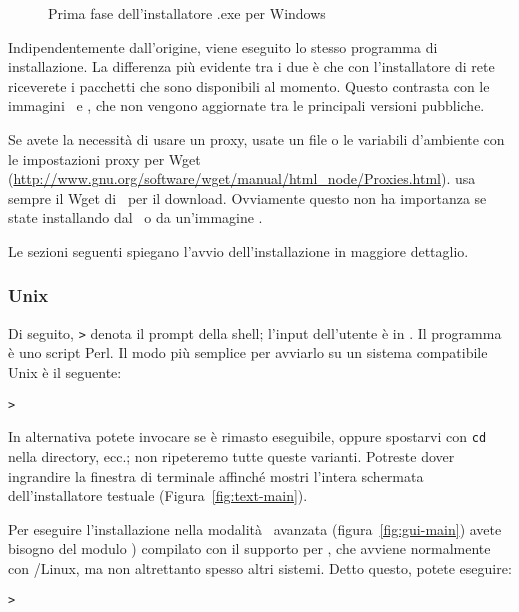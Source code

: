 \documentclass{article}
\begin{document}
\begin{figure}[tb]
\caption{Prima fase dell'installatore .exe per Windows}\label{fig:nsis}
\end{figure}

Indipendentemente dall'origine, viene eseguito lo stesso programma di
installazione. La differenza più evidente tra i due è che con l'installatore
di rete riceverete i pacchetti che sono disponibili al momento. Questo
contrasta con le immagini \DVD\ e \ISO, che non vengono aggiornate tra le
principali versioni pubbliche.

Se avete la necessità di usare un proxy, usate un file
 o le variabili d'ambiente con le impostazioni proxy
per Wget
(\url{http://www.gnu.org/software/wget/manual/html_node/Proxies.html}).
\TL{} usa sempre il Wget di \GNU\ per il download. Ovviamente questo non
ha importanza se state installando dal \DVD\ o da un'immagine \ISO.

\noindent
Le sezioni seguenti spiegano l'avvio dell'installazione in maggiore
dettaglio.

\subsubsection{Unix}

Di seguito, \texttt{>} denota il prompt della shell; l'input dell'utente è
in .
Il programma  è uno script Perl. Il modo più semplice
per avviarlo su un sistema compatibile Unix è il seguente:
\begin{alltt}
> 
\end{alltt}
In alternativa potete invocare
 se è rimasto eseguibile,
oppure spostarvi con \texttt{cd} nella directory, ecc.; non ripeteremo
tutte queste varianti. Potreste dover ingrandire la finestra di terminale
affinché mostri l'intera schermata dell'installatore testuale
(Figura~\ref{fig:text-main}).

Per eseguire l'installazione nella modalità \GUI\ avanzata
(figura~\ref{fig:gui-main}) avete bisogno del modulo )
compilato con il supporto per , che avviene normalmente con
\GNU/Linux, ma non altrettanto spesso altri sistemi. Detto questo, potete
eseguire:
\begin{alltt}
> 
\end{alltt}
\end{document}
